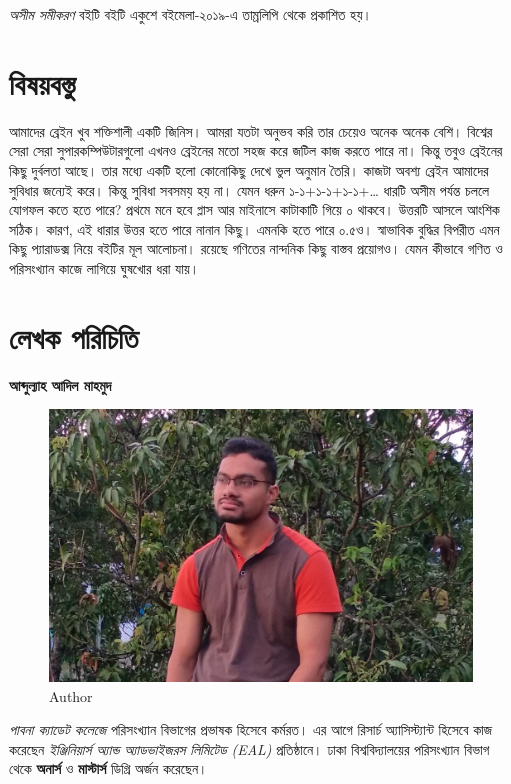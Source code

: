 \documentclass[
]{book}
\begin{document}
\emph{অসীম সমীকরণ} বইটি বইটি একুশে বইমেলা-২০১৯-এ তাম্রলিপি থেকে প্রকাশিত হয়।

\hypertarget{ux9acux9bfux9b7ux9dfux9acux9b8ux9cdux9a4ux9c1}{%
\section{বিষয়বস্তু}\label{ux9acux9bfux9b7ux9dfux9acux9b8ux9cdux9a4ux9c1}}

আমাদের ব্রেইন খুব শক্তিশালী একটি জিনিস। আমরা যতটা অনুভব করি তার চেয়েও অনেক অনেক বেশি। বিশ্বের সেরা সেরা সুপারকম্পিউটারগুলো এখনও ব্রেইনের মতো সহজ করে জটিল কাজ করতে পারে না। কিন্তু তবুও ব্রেইনের কিছু দুর্বলতা আছে। তার মধ্যে একটি হলো কোনোকিছু দেখে ভুল অনুমান তৈরি। কাজটা অবশ্য ব্রেইন আমাদের সুবিধার জন্যেই করে। কিন্তু সুবিধা সবসময় হয় না। যেমন ধরুন ১-১+১-১+১-১+\ldots{} ধারটি অসীম পর্যন্ত চললে যোগফল কতে হতে পারে? প্রথমে মনে হবে প্লাস আর মাইনাসে কাটাকাটি গিয়ে ০ থাকবে। উত্তরটি আসলে আংশিক সঠিক। কারণ, এই ধারার উত্তর হতে পারে নানান কিছু। এমনকি হতে পারে ০.৫ও। স্বাভাবিক বুদ্ধির বিপরীত এমন কিছু প্যারাডক্স নিয়ে বইটির মূল আলোচনা। রয়েছে গণিতের নান্দনিক কিছু বাস্তব প্রয়োগও। যেমন কীভাবে গণিত ও পরিসংখ্যান কাজে লাগিয়ে ঘুষখোর ধরা যায়।

\hypertarget{ux9b2ux9c7ux996ux995-ux9aaux9b0ux9bfux99aux9bfux9a4ux9bf}{%
\section{লেখক পরিচিতি}\label{ux9b2ux9c7ux996ux995-ux9aaux9b0ux9bfux99aux9bfux9a4ux9bf}}

\textbf{আব্দুল্যাহ আদিল মাহমুদ}

\begin{figure}

{\centering \includegraphics[width=0.5\linewidth]{mahmud} 

}

\caption{Author}\label{fig:author}
\end{figure}

\emph{পাবনা ক্যাডেট কলেজে} পরিসংখ্যান বিভাগের প্রভাষক হিসেবে কর্মরত। এর আগে রিসার্চ অ্যাসিস্ট্যান্ট হিসেবে কাজ করেছেন \emph{ইঞ্জিনিয়ার্স অ্যান্ড অ্যাডভাইজরস লিমিটেড (EAL)} প্রতিষ্ঠানে। ঢাকা বিশ্ববিদ্যালয়ের পরিসংখ্যান বিভাগ থেকে \textbf{অনার্স} ও \textbf{মাস্টার্স} ডিগ্রি অর্জন করেছেন।
\end{document}
